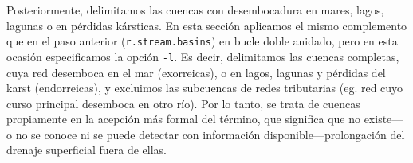 \documentclass[spanish]{article}
\newenvironment{Shaded}{\begin{snugshade}}{\end{snugshade}}
\newcommand{\AttributeTok}[1]{\textcolor[rgb]{0.77,0.63,0.00}{#1}}
\newcommand{\BuiltInTok}[1]{#1}
\newcommand{\CommentTok}[1]{\textcolor[rgb]{0.56,0.35,0.01}{\textit{#1}}}
\newcommand{\ControlFlowTok}[1]{\textcolor[rgb]{0.13,0.29,0.53}{\textbf{#1}}}
\newcommand{\DataTypeTok}[1]{\textcolor[rgb]{0.13,0.29,0.53}{#1}}
\newcommand{\DecValTok}[1]{\textcolor[rgb]{0.00,0.00,0.81}{#1}}
\newcommand{\ExtensionTok}[1]{#1}
\newcommand{\KeywordTok}[1]{\textcolor[rgb]{0.13,0.29,0.53}{\textbf{#1}}}
\newcommand{\NormalTok}[1]{#1}
\newcommand{\StringTok}[1]{\textcolor[rgb]{0.31,0.60,0.02}{#1}}
\newcommand{\VariableTok}[1]{\textcolor[rgb]{0.00,0.00,0.00}{#1}}
\begin{document}
\begin{Shaded}
\end{Shaded}

Posteriormente, delimitamos las cuencas con desembocadura en mares,
lagos, lagunas o en pérdidas kársticas. En esta sección aplicamos el
mismo complemento que en el paso anterior (\texttt{r.stream.basins}) en
bucle doble anidado, pero en esta ocasión especificamos la opción
\texttt{-l}. Es decir, delimitamos las cuencas completas, cuya red
desemboca en el mar (exorreicas), o en lagos, lagunas y pérdidas del
karst (endorreicas), y excluimos las subcuencas de redes tributarias
(eg. red cuyo curso principal desemboca en otro río). Por lo tanto, se
trata de cuencas propiamente en la acepción más formal del término, que
significa que no existe---o no se conoce ni se puede detectar con
información disponible---prolongación del drenaje superficial fuera de
ellas.
\end{document}
